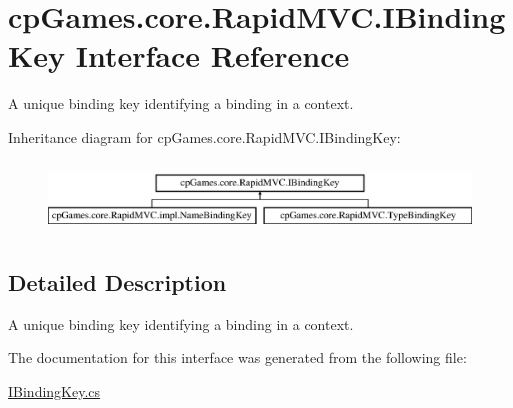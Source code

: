 \hypertarget{interfacecp_games_1_1core_1_1_rapid_m_v_c_1_1_i_binding_key}{}\section{cp\+Games.\+core.\+Rapid\+M\+V\+C.\+I\+Binding\+Key Interface Reference}
\label{interfacecp_games_1_1core_1_1_rapid_m_v_c_1_1_i_binding_key}


A unique binding key identifying a binding in a context.  


Inheritance diagram for cp\+Games.\+core.\+Rapid\+M\+V\+C.\+I\+Binding\+Key\+:\begin{figure}[H]
\begin{center}
\leavevmode
\includegraphics[height=1.911263cm]{interfacecp_games_1_1core_1_1_rapid_m_v_c_1_1_i_binding_key}
\end{center}
\end{figure}


\subsection{Detailed Description}
A unique binding key identifying a binding in a context. 



The documentation for this interface was generated from the following file\+:\begin{DoxyCompactItemize}
\item 
\mbox{\hyperlink{_i_binding_key_8cs}{I\+Binding\+Key.\+cs}}\end{DoxyCompactItemize}
